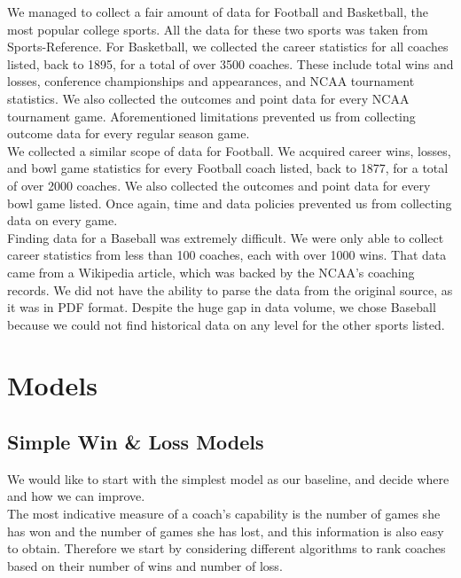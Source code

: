 \documentclass[titlepage]{article}
\begin{document}
\noindent We managed to collect a fair amount of data for Football and Basketball, the most popular college sports. All the data for these two sports was taken from Sports-Reference. For Basketball, we collected the career statistics for all coaches listed, back to 1895, for a total of over 3500 coaches. These include total wins and losses, conference championships and appearances, and NCAA tournament statistics. We also collected the outcomes and point data for every NCAA tournament game. Aforementioned limitations prevented us from collecting outcome data for every regular season game. 
\\

\noindent We collected a similar scope of data for Football. We acquired career wins, losses, and bowl game statistics for every Football coach listed, back to 1877, for a total of over 2000 coaches. We also collected the outcomes and point data for every bowl game listed. Once again, time and data policies prevented us from collecting data on every game.
\\

\noindent Finding data for a Baseball was extremely difficult. We were only able to collect career statistics from less than 100 coaches, each with over 1000 wins. That data came from a Wikipedia article, which was backed by the NCAA's coaching records. We did not have the ability to parse the data from the original source, as it was in PDF format. Despite the huge gap in data volume, we chose Baseball because we could not find historical data on any level for the other sports listed.


\section{Models}

\subsection{Simple Win \& Loss Models}

We would like to start with the simplest model as our baseline, and decide where and how we can improve.
\\

\noindent The most indicative measure of a coach's capability is the number of games she has won and the number of games she has lost, and this information is also easy to obtain. Therefore we start by considering different algorithms to rank coaches based on their number of wins and number of loss.
\end{document}
